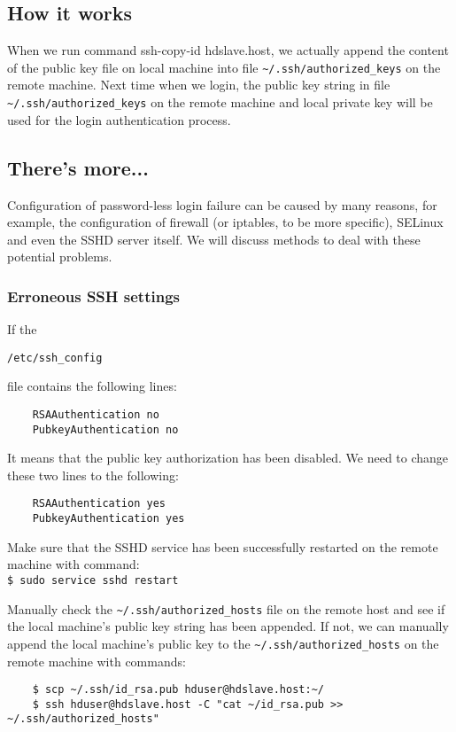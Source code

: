 \subsection*{How it works}
When we run command ssh-copy-id hdslave.host, we actually append the content of the public key file on local machine into file \verb|~/.ssh/authorized_keys| on the remote machine. Next time when we login, the public key string in file \verb|~/.ssh/authorized_keys| on the remote machine and local private key will be used for the login authentication process.
\subsection*{There's more...}
Configuration of password-less login failure can be caused by many reasons, for example, the configuration of firewall (or iptables, to be more specific), SELinux and even the SSHD server itself. We will discuss methods to deal with these potential problems.
\subsubsection*{Erroneous SSH settings}
If the \begin{verbatim}/etc/ssh_config\end{verbatim} file contains the following lines:
\begin{verbatim}
    RSAAuthentication no
    PubkeyAuthentication no
\end{verbatim}

It means that the public key authorization has been disabled. We need to change these two lines to the following:
\begin{verbatim}
    RSAAuthentication yes
    PubkeyAuthentication yes
\end{verbatim}

Make sure that the SSHD service has been successfully restarted on the remote machine with command: \\ 
\verb|$ sudo service sshd restart|

Manually check the \verb|~/.ssh/authorized_hosts| file on the remote host and see if the local machine's public key string has been appended. If not, we can manually append the local machine's public key to the \verb|~/.ssh/authorized_hosts| on the remote machine with commands: \\
\begin{verbatim}
    $ scp ~/.ssh/id_rsa.pub hduser@hdslave.host:~/
    $ ssh hduser@hdslave.host -C "cat ~/id_rsa.pub >> ~/.ssh/authorized_hosts"
\end{verbatim}

